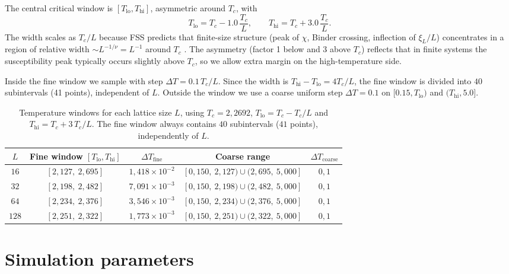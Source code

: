 The central critical window is $[T_{\text{lo}},T_{\text{hi}}]$, asymmetric around $T_c$, with
\[ T_{\text{lo}} = T_c - 1.0\,\frac{T_c}{L}, \qquad T_{\text{hi}} = T_c + 3.0\,\frac{T_c}{L}. \]
The width scales as $T_c/L$ because FSS predicts that finite-size structure (peak of $\chi$, Binder crossing, inflection of $\xi_L/L$) concentrates in a region of relative width $\sim L^{-1/\nu}=L^{-1}$ around $T_c$ \citep{Newman1999}. The asymmetry (factor 1 below and 3 above $T_c$) reflects that in finite systems the susceptibility peak typically occurs slightly above $T_c$, so we allow extra margin on the high-temperature side.

Inside the fine window we sample with step $\Delta T=0.1\,T_c/L$. Since the width is $T_{\text{hi}}-T_{\text{lo}}=4T_c/L$, the fine window is divided into $40$ subintervals (41 points), independent of $L$. Outside the window we use a coarse uniform step $\Delta T=0.1$ on $[0.15,T_{\text{lo}})$ and $(T_{\text{hi}},5.0]$.

\begin{table}
\centering
\begin{tabular}{ccccc}
\toprule
$L$ & Fine window $[T_{\mathrm{lo}}, T_{\mathrm{hi}}]$ & $\Delta T_{\mathrm{fine}}$ & Coarse range & $\Delta T_{\mathrm{coarse}}$ \\
\midrule
$16$  & $[2{,}127,\ 2{,}695]$ & $1{,}418\times10^{-2}$ & $[0{,}150,\ 2{,}127)\cup(2{,}695,\ 5{,}000]$ & $0{,}1$ \\
$32$  & $[2{,}198,\ 2{,}482]$ & $7{,}091\times10^{-3}$ & $[0{,}150,\ 2{,}198)\cup(2{,}482,\ 5{,}000]$ & $0{,}1$ \\
$64$  & $[2{,}234,\ 2{,}376]$ & $3{,}546\times10^{-3}$ & $[0{,}150,\ 2{,}234)\cup(2{,}376,\ 5{,}000]$ & $0{,}1$ \\
$128$ & $[2{,}251,\ 2{,}322]$ & $1{,}773\times10^{-3}$ & $[0{,}150,\ 2{,}251)\cup(2{,}322,\ 5{,}000]$ & $0{,}1$ \\
\bottomrule
\end{tabular}
\caption{Temperature windows for each lattice size $L$, using $T_c=2{,}2692$, $T_{\mathrm{lo}}=T_c-T_c/L$ and $T_{\mathrm{hi}}=T_c+3\,T_c/L$. The fine window always contains $40$ subintervals ($41$ points), independently of $L$.}
\label{tab:malla_T}
\end{table}

\section{Simulation parameters}

